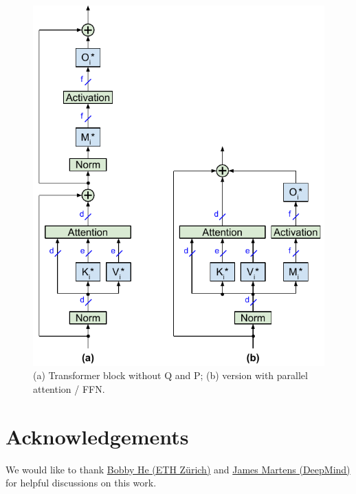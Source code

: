 \documentclass{article}
\begin{document}
\begin{figure} \centering
  \includegraphics[scale=0.92]{figs/remove_fig4.pdf}
  \caption{(a) Transformer block without Q and P; (b) version with parallel attention / FFN.}
\label{fig4} \end{figure}

\section*{Acknowledgements}
We would like to thank \href{https://scholar.google.com/citations?user=HKft_LAAAAAJ&hl=en}{Bobby He (ETH Zürich)} and \href{https://scholar.google.com/citations?user=LlK_saMAAAAJ&hl=en}{James Martens (DeepMind)} for helpful discussions on this work.



\end{document}
